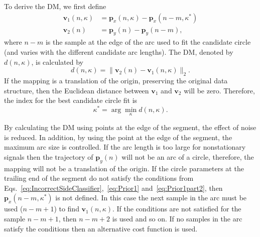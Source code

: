 \documentclass[journal,11pt,a4paper,onecolumn,draftcls]{IEEEtran}
\begin{document}
To derive the DM, we first define
\begin{align}
	\mathbf{v}_1\left( n,\kappa \right) &= \mathbf{p}_x(n,\kappa)-\mathbf{p}_x(n-m,\kappa^*) \label{v1} \\
	\mathbf{v}_2\left( n \right) &= \mathbf{p}_y(n)-\mathbf{p}_y(n-m), \label{v2}
\end{align}
where $n-m$ is the sample at the edge of the arc used to fit the candidate circle (and varies with the different candidate arc lengths). The DM, denoted by $d\left( {n,\kappa} \right)$, is calculated by
\begin{equation}\label{eq:relative_distance_mismatch}
    d\left( {n,\kappa} \right) = \|\mathbf{v}_2\left( n \right)-\mathbf{v}_1\left( n,\kappa \right)\|_2.
\end{equation}
If the mapping is a translation of the origin, preserving the original data structure, then the Euclidean distance between $\mathbf{v}_1$ and $\mathbf{v}_2$ will be zero. Therefore, the index for the best candidate circle fit is
\begin{equation}\label{Kappa_star}
\kappa^* = \arg \mathop{\min} \limits_\kappa d\left( n,\kappa \right).
\end{equation}

By calculating the DM using points at the edge of the segment, the effect of noise is reduced. In addition, by using the point at the edge of the segment, the maximum arc size is controlled. If the arc length is too large for nonstationary signals then the trajectory of $\mathbf{p}_y(n)$ will not be an arc of a circle, therefore, the mapping will not be a translation of the origin. If the circle parameters at the trailing end of the segment do not satisfy the conditions from Eqs.~\ref{eq:IncorrectSideClassifier},~\ref{eq:Prior1} and~\ref{eq:Prior1part2}, then $\mathbf{p}_x(n-m,\kappa^*)$ is not defined. In this case the next sample in the arc must be used ($n-m+1$) to find $\mathbf{v}_1(n,\kappa)$. If the conditions are not satisfied for the sample $n-m+1$, then $n-m+2$ is used and so on. If no samples in the arc satisfy the conditions then an alternative cost function is used. 
\end{document}
